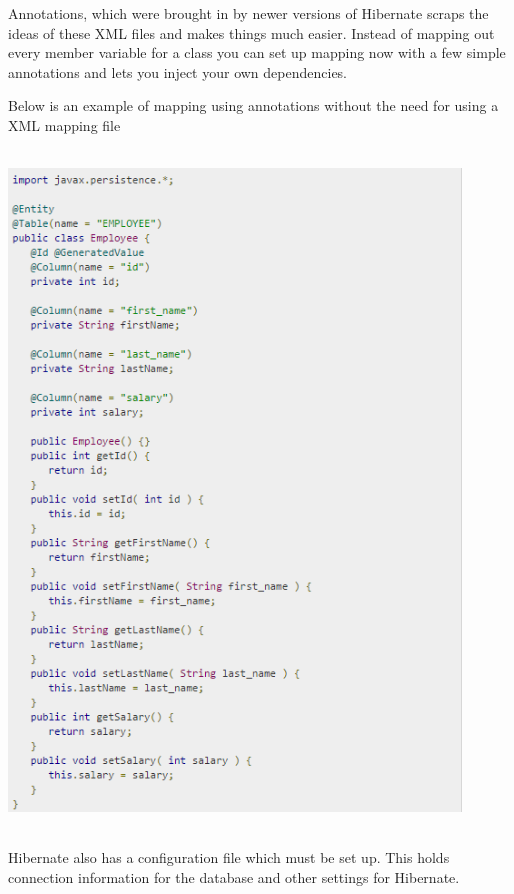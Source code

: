 Annotations, which were brought in by newer versions of Hibernate scraps the ideas of these XML files and makes things much easier. Instead of mapping out every member variable for a class you can set up mapping now with a few simple annotations and lets you inject your own dependencies. \newline

\noindent Below is an example of mapping using annotations without the need for using a XML mapping file

\begin{center}    
	\includegraphics[height=18cm, width=12cm]{img/hibernateclass.png}
\end{center}

Hibernate also has a configuration file which must be set up. This holds connection information for the database and other settings for Hibernate.

